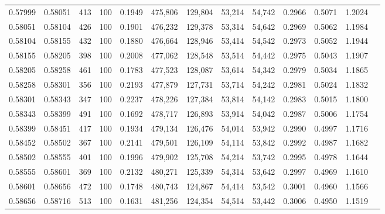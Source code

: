 \begin{tabular}{rrrrrrrrrrrrr}
0.57999 & 0.58051 &   413 & 100 &                                     0.1949 & 475,806 & 129,804 &  53,214 &  54,742 & 0.2966 & 0.5071 & 1.2024 \\
0.58051 & 0.58104 &   426 & 100 &                                     0.1901 & 476,232 & 129,378 &  53,314 &  54,642 & 0.2969 & 0.5062 & 1.1984 \\
0.58104 & 0.58155 &   432 & 100 &                                     0.1880 & 476,664 & 128,946 &  53,414 &  54,542 & 0.2973 & 0.5052 & 1.1944 \\
0.58155 & 0.58205 &   398 & 100 &                                     0.2008 & 477,062 & 128,548 &  53,514 &  54,442 & 0.2975 & 0.5043 & 1.1907 \\
0.58205 & 0.58258 &   461 & 100 &                                     0.1783 & 477,523 & 128,087 &  53,614 &  54,342 & 0.2979 & 0.5034 & 1.1865 \\
0.58258 & 0.58301 &   356 & 100 &                                     0.2193 & 477,879 & 127,731 &  53,714 &  54,242 & 0.2981 & 0.5024 & 1.1832 \\
0.58301 & 0.58343 &   347 & 100 &                                     0.2237 & 478,226 & 127,384 &  53,814 &  54,142 & 0.2983 & 0.5015 & 1.1800 \\
0.58343 & 0.58399 &   491 & 100 &                                     0.1692 & 478,717 & 126,893 &  53,914 &  54,042 & 0.2987 & 0.5006 & 1.1754 \\
0.58399 & 0.58451 &   417 & 100 &                                     0.1934 & 479,134 & 126,476 &  54,014 &  53,942 & 0.2990 & 0.4997 & 1.1716 \\
0.58452 & 0.58502 &   367 & 100 &                                     0.2141 & 479,501 & 126,109 &  54,114 &  53,842 & 0.2992 & 0.4987 & 1.1682 \\
0.58502 & 0.58555 &   401 & 100 &                                     0.1996 & 479,902 & 125,708 &  54,214 &  53,742 & 0.2995 & 0.4978 & 1.1644 \\
0.58555 & 0.58601 &   369 & 100 &                                     0.2132 & 480,271 & 125,339 &  54,314 &  53,642 & 0.2997 & 0.4969 & 1.1610 \\
0.58601 & 0.58656 &   472 & 100 &                                     0.1748 & 480,743 & 124,867 &  54,414 &  53,542 & 0.3001 & 0.4960 & 1.1566 \\
0.58656 & 0.58716 &   513 & 100 &                                     0.1631 & 481,256 & 124,354 &  54,514 &  53,442 & 0.3006 & 0.4950 & 1.1519 \\

\end{tabular}
